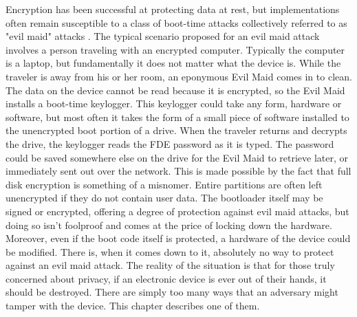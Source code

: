 Encryption has been successful at protecting data at rest, but implementations often remain susceptible to a class of boot-time
attacks collectively referred to as "evil maid" attacks \cite{schneiermaid}. The typical scenario proposed for an evil maid attack
involves a person traveling with an encrypted computer. Typically the computer is a laptop, but fundamentally it does not matter
what the device is.  While the traveler is away from his or her room, an eponymous Evil Maid comes in to clean. The data on the
device cannot be read because it is encrypted, so the Evil Maid installs a boot-time keylogger. This keylogger could take any form,
hardware or software, but most often it takes the form of a small piece of software installed to the unencrypted boot portion of a
drive. When the traveler returns and decrypts the drive, the keylogger reads the FDE password as it is typed. The password could be
saved somewhere else on the drive for the Evil Maid to retrieve later, or immediately sent out over the network.
This is made possible by the fact that full disk encryption is something of a misnomer.  Entire partitions are often left
unencrypted if they do not contain user data.  The bootloader itself may be signed or encrypted, offering a degree of protection
against evil maid attacks, but doing so isn't foolproof \cite{attackingbitlocker} and comes at the price of locking down the
hardware. Moreover, even if the boot code itself is protected, a hardware of the device could be modified. There is, when it comes
down to it, absolutely no way to protect against an evil maid attack.  The reality of the situation is that for those truly
concerned about privacy, if an electronic device is ever out of their hands, it should be destroyed. There are simply too many ways
that an adversary might tamper with the device. This chapter describes one of them.

